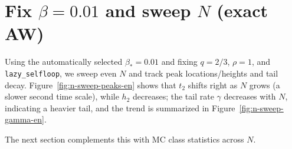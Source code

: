 \section{Fix \texorpdfstring{$\beta=0.01$}{beta=0.01} and sweep \texorpdfstring{$N$}{N} (exact AW)}
Using the automatically selected $\beta_\ast=0.01$ and fixing $q=2/3$, $\rho=1$, and \texttt{lazy\_selfloop}, we sweep even $N$ and track peak locations/heights and tail decay.
Figure~\ref{fig:n-sweep-peaks-en} shows that $t_2$ shifts right as $N$ grows (a slower second time scale), while $h_2$ decreases; the tail rate $\gamma$ decreases with $N$, indicating a heavier tail, and the trend is summarized in Figure~\ref{fig:n-sweep-gamma-en}.

The next section complements this with MC class statistics across $N$.
